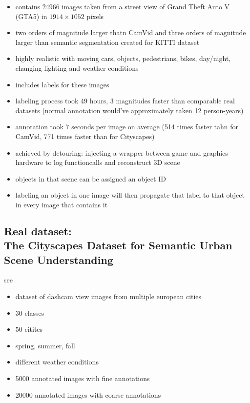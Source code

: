 \begin{itemize}
	\item contains 24966 images taken from a street view of Grand Theft Auto V (GTA5) in $1914 \times 1052$ pixels
	\item two orders of magnitude larger thatn CamVid and three orders of magnitude larger than semantic segmentation created for KITTI dataset
	\item highly realistic with moving cars, objects, pedestrians, bikes, day/night, changing lighting and weather conditions
	\item includes labels for these images
	\item labeling process took 49 hours, 3 magnitudes faster than comparable real datasets (normal annotation would've approximately taken 12 person-years)
	\item annotation took 7 seconds per image on average (514 times faster tahn for CamVid, 771 times faster than for Cityscapes)
	\item achieved by detouring: injecting a wrapper between game and graphics hardware to log functioncalls and reconstruct 3D scene
	\item objects in that scene can be assigned an object ID
	\item labeling an object in one image will then propagate that label to that object in every image that contains it
\end{itemize}

\subsection{Real dataset:\\
	The Cityscapes Dataset for Semantic Urban Scene Understanding}
see \cite{Cordts_2016_CVPR}

\begin{itemize}
	\item dataset of dashcam view images from multiple european cities
	\item 30 classes
	\item 50 citites
	\item spring, summer, fall
	\item different weather conditions
	\item 5000 annotated images with fine annotations
	\item 20000 annotated images with coarse annotations
\end{itemize}


